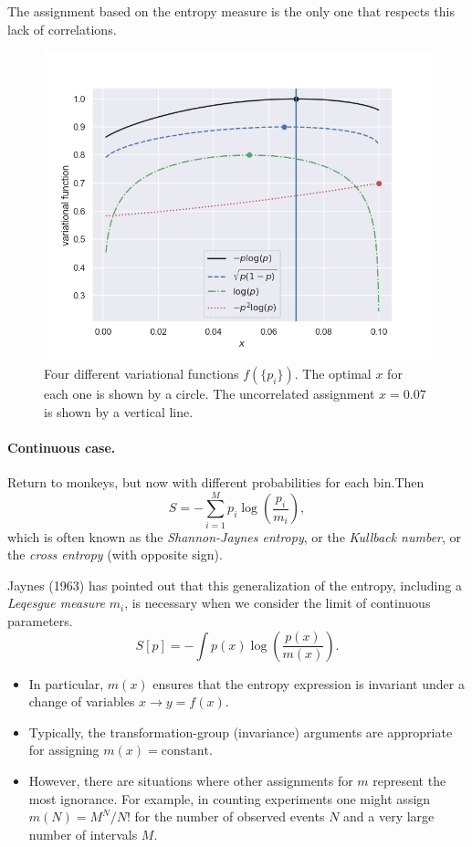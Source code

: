 \documentclass[%
oneside,                 %
final,                   %
10pt]{article}
\begin{document}
\noindent


\vspace{3mm}


The assignment based on the entropy measure is the only one that respects this lack of correlations.


\begin{figure}[!ht]  %
  \centerline{\includegraphics[width=0.8\linewidth]{fig/scandinavian_entropy.png}}
  \caption{
  Four different variational functions $f\left( \{ p_i \} \right)$. The optimal $x$ for each one is shown by a circle. The uncorrelated assignment $x=0.07$ is shown by a vertical line.
  }
\end{figure}


\paragraph{Continuous case.}
Return to monkeys, but now with different probabilities for each bin.Then
\[
S= −\sum_{i=1}^M p_i \log \left( \frac{p_i}{m_i} \right),
\]
which is often known as the \emph{Shannon-Jaynes entropy}, or the \emph{Kullback number}, or the \emph{cross entropy} (with opposite sign).

Jaynes (1963) has pointed out that this generalization of the entropy, including a \emph{Leqesgue measure} $m_i$, is necessary when we consider the limit of continuous parameters. 
\[
S[p]= −\int p(x) \log \left( \frac{p(x)}{m(x)} \right).
\]

\begin{itemize}
\item In particular, $m(x)$ ensures that the entropy expression is invariant under a change of variables $x \to y=f(x)$.

\item Typically, the transformation-group (invariance) arguments are appropriate for assigning $m(x) = \mathrm{constant}$.

\item However, there are situations where other assignments for $m$ represent the most ignorance. For example, in counting experiments one might assign $m(N) = M^N / N!$ for the number of observed events $N$ and a very large number of intervals $M$.
\end{itemize}
\end{document}
